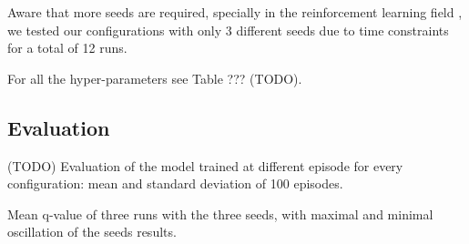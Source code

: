 Aware that more seeds are required, specially in the reinforcement learning field \cite{DBLP:journals/corr/abs-1709-06560}, we tested our configurations with only 3 different seeds due to time constraints for a total of 12 runs.

For all the hyper-parameters see Table ??? (TODO).


\subsection{Evaluation}

(TODO)
Evaluation of the model trained at different episode for every configuration:
mean and standard deviation of 100 episodes.

Mean q-value of three runs with the three seeds, with maximal and minimal oscillation of the seeds results.



